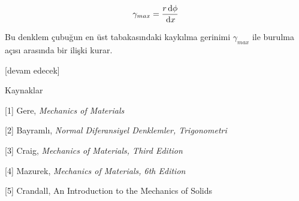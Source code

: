 \documentclass[12pt,fleqn]{article}\usepackage{../../common}
\begin{document}
$$
\gamma_{max} = \frac{r \,\mathrm{d} \phi}{\,\mathrm{d} x}
$$

Bu denklem çubuğun en üst tabakasındaki kaykılma gerinimi $\gamma_{max}$
ile burulma açısı arasında bir ilişki kurar.


[devam edecek]

Kaynaklar

[1] Gere, {\em Mechanics of Materials}

[2] Bayramlı, {\em Normal Diferansiyel Denklemler, Trigonometri}

[3] Craig, {\em Mechanics of Materials, Third Edition}

[4] Mazurek, {\em Mechanics of Materials, 6th Edition}

[5] Crandall, An Introduction to the Mechanics of Solids
\end{document}
